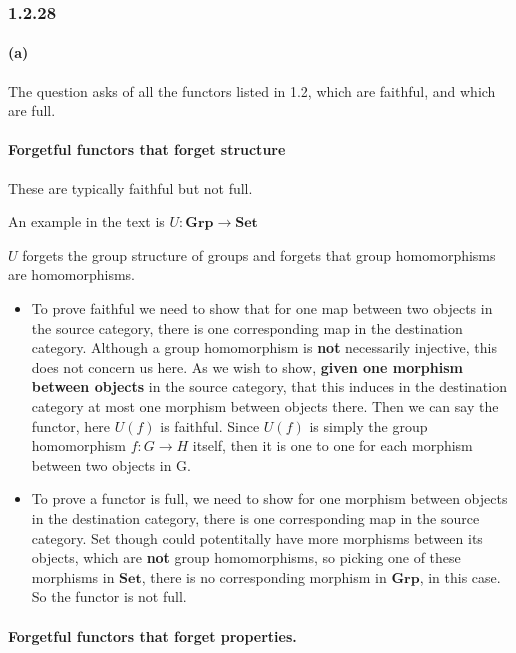 \documentclass{article}
\begin{document}
\subsubsection*{1.2.28}

\paragraph{(a)}

The question asks of all the functors listed in 1.2, which are faithful, and which are full.

\paragraph{Forgetful functors that forget structure}

These are typically faithful but not full.

An example in the text is $U\colon\textbf{Grp} \rightarrow \textbf{Set}$

$U$ forgets the group structure of groups and forgets that group homomorphisms are homomorphisms.

\begin{itemize}
\item To prove faithful we need to show that for one map between two objects in the source category, there is one corresponding map in the destination category. Although a group homomorphism is \textbf{not} necessarily injective, this does not concern us here. As we wish to show, \textbf{given one morphism between objects} in the source category, that this induces in the destination category at most one morphism between objects there. Then we can say the functor, here $U(f)$ is faithful. Since $U(f)$ is simply the group homomorphism $f\colon G \rightarrow H$ itself, then it is one to one for each morphism between two objects in G.

\item To prove a functor is full, we need to show for one morphism between objects in the destination category, there is one corresponding map in the source category. Set though could potentitally have more morphisms between its objects, which are \textbf{not} group homomorphisms, so picking one of these morphisms in $\textbf{Set}$, there is no corresponding morphism in $\textbf{Grp}$, in this case. So the functor is not full.
\end{itemize}

\paragraph{Forgetful functors that forget properties.}
\end{document}
